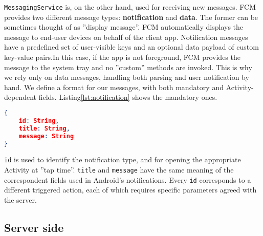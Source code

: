 \texttt{MessagingService} is, on the other hand, used for receiving new messages. FCM provides two different message types: \textbf{notification} and \textbf{data}. The former can be sometimes thought of as ''display message''. FCM automatically displays the message to end-user devices on behalf of the client app. Notification messages have a predefined set of user-visible keys and an optional data payload of custom key-value pairs.In this case, if the app is not foreground, FCM provides the message to the system tray and no ''custom'' methods are invoked. This is why we rely only on data messages, handling both parsing and user notification by hand. We define a format for our messages, with both mandatory and Activity-dependent fields. Listing\ref{lst:notification} shows the mandatory ones.
\begin{lstlisting}[language=json, caption={Mandatory fields for a notification}, label={lst:notification}]
{
	id: String,
	title: String,
	message: String
}
\end{lstlisting}
\texttt{id} is used to identify the notification type, and for opening the appropriate Activity at ''tap time''. \texttt{title} and \texttt{message} have the same meaning of the correspondent fields used in Android's notifications. Every \texttt{id} corresponds to a different triggered action, each of which requires specific parameters agreed with the server.

\subsection{Server side}
